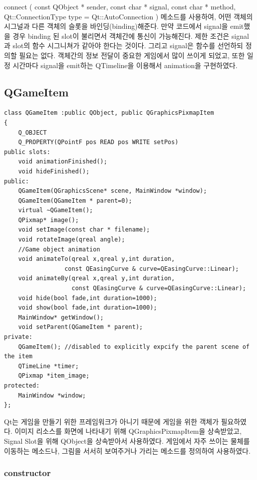\documentclass[10pt,oneside,a4paper,titlepage]{article}
\begin{document}
\noindent connect ( const QObject * sender, const char * signal, const char * method, Qt::ConnectionType type = Qt::AutoConnection ) 메소드를 사용하여, 어떤 객체의 시그널과 다른 객체의 슬롯을 바인딩(binding)해준다. 만약 코드에서 signal을 emit했을 경우 binding 된 slot이 불리면서 객체간에 통신이 가능해진다. 제한 조건은 signal과 slot의 함수 시그니쳐가 같아야 한다는 것이다. 그리고 signal은 함수를 선언하되 정의할 필요는 없다. 객체간의 정보 전달이 중요한 게임에서 많이 쓰이게 되었고, 또한 일정 시간마다 signal을 emit하는 QTimeline을 이용해서 animation을 구현하였다. 

\subsection{QGameItem}
\begin{lstlisting}[frame=single,caption=
{QGameItem header},label=code:FD,captionpos=b,framexleftmargin=10pt]
class QGameItem :public QObject, public QGraphicsPixmapItem
{
    Q_OBJECT
    Q_PROPERTY(QPointF pos READ pos WRITE setPos)
public slots:
    void animationFinished();
    void hideFinished();
public:
    QGameItem(QGraphicsScene* scene, MainWindow *window);
    QGameItem(QGameItem * parent=0);
    virtual ~QGameItem();
    QPixmap* image();
    void setImage(const char * filename);
    void rotateImage(qreal angle);
    //Game object animation
    void animateTo(qreal x,qreal y,int duration,
                 const QEasingCurve & curve=QEasingCurve::Linear);
    void animateBy(qreal x,qreal y,int duration,
                   const QEasingCurve & curve=QEasingCurve::Linear);
    void hide(bool fade,int duration=1000);
    void show(bool fade,int duration=1000);
    MainWindow* getWindow();
    void setParent(QGameItem * parent);
private:
    QGameItem(); //disabled to explicitly expcify the parent scene of the item
    QTimeLine *timer;
    QPixmap *item_image;
protected:
    MainWindow *window;
};
\end{lstlisting}

Qt는 게임을 만들기 위한 프레임워크가 아니기 때문에 게임을 위한 객체가 필요하였다. 이미지 리소스를 화면에 나타내기 위해 QGraphicsPixmapItem을 상속받았고, Signal Slot을 위해 QObject을 상속받아서 사용하였다. 게임에서 자주 쓰이는 물체를 이동하는 메소드나, 그림을 서서히 보여주거나 가리는 메소드를 정의하여 사용하였다. 


\subsubsection{constructor}
\end{document}
